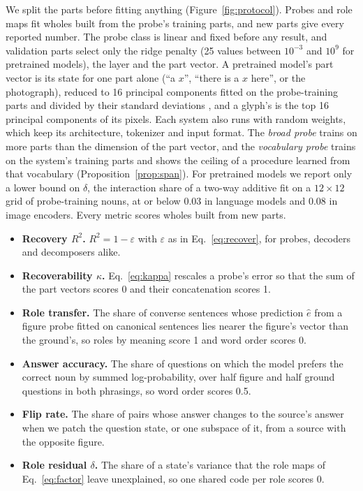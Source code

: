 We split the parts before fitting anything (Figure~\ref{fig:protocol}). Probes and role maps fit wholes built from the probe's training parts, and new parts give every reported number. The probe class is linear and fixed before any result, and validation parts select only the ridge penalty (25 values between $10^{-3}$ and $10^{9}$ for pretrained models), the layer and the part vector. A pretrained model's part vector is its state for one part alone (``a $x$'', ``there is a $x$ here'', or the photograph), reduced to 16 principal components fitted on the probe-training parts and divided by their standard deviations \citep{timkey2021}, and a glyph's is the top 16 principal components of its pixels. Each system also runs with random weights, which keep its architecture, tokenizer and input format. The \emph{broad probe} trains on more parts than the dimension of the part vector, and the \emph{vocabulary probe} trains on the system's training parts and shows the ceiling of a procedure learned from that vocabulary (Proposition~\ref{prop:span}). For pretrained models we report only a lower bound on $\delta$, the interaction share of a two-way additive fit on a $12 \times 12$ grid of probe-training nouns, at or below 0.03 in language models and 0.08 in image encoders. Every metric scores wholes built from new parts.
\begin{itemize}
  \item \textbf{Recovery $R^2$.} $R^2 = 1 - \varepsilon$ with $\varepsilon$ as in Eq.~\eqref{eq:recover}, for probes, decoders and decomposers alike.
  \item \textbf{Recoverability $\kappa$.} Eq.~\eqref{eq:kappa} rescales a probe's error so that the sum of the part vectors scores 0 and their concatenation scores 1.
  \item \textbf{Role transfer.} The share of converse sentences whose prediction $\hat{e}$ from a figure probe fitted on canonical sentences lies nearer the figure's vector than the ground's, so roles by meaning score 1 and word order scores 0.
  \item \textbf{Answer accuracy.} The share of questions on which the model prefers the correct noun by summed log-probability, over half figure and half ground questions in both phrasings, so word order scores 0.5.
  \item \textbf{Flip rate.} The share of pairs whose answer changes to the source's answer when we patch the question state, or one subspace of it, from a source with the opposite figure.
  \item \textbf{Role residual $\delta$.} The share of a state's variance that the role maps of Eq.~\eqref{eq:factor} leave unexplained, so one shared code per role scores 0.
\end{itemize}
